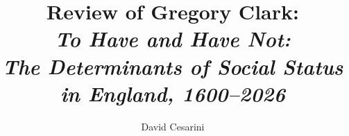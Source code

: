 \documentclass[12pt]{article}
\title{Review of Gregory Clark:\\ \emph{To Have and Have Not:}\\
\emph{The Determinants of Social Status in England, 1600--2026}}
\author{David Cesarini}
\date{}
\renewcommand{\thesection}{\Roman{section}}
\begin{document}
\maketitle










\clearpage


\clearpage
\appendix
\renewcommand{\thesection}{\Alph{section}}






\end{document}
